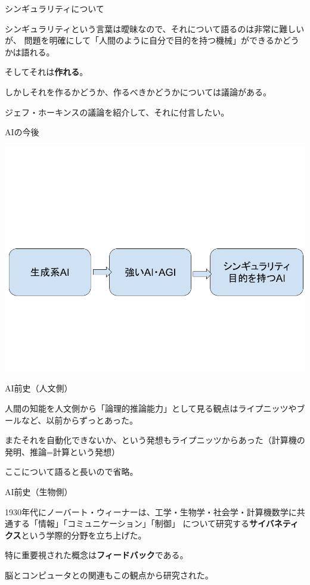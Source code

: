 \documentclass[12pt, unicode]{beamer}
\begin{document}
\begin{frame}{シンギュラリティについて}

シンギュラリティという言葉は曖昧なので、それについて語るのは非常に難しいが、
問題を明確にして「人間のように自分で目的を持つ機械」ができるかどうかは語れる。

そしてそれは\textbf{作れる}。

しかしそれを作るかどうか、作るべきかどうかについては議論がある。

ジェフ・ホーキンスの議論を紹介して、それに付言したい。

\end{frame}

\begin{frame}{AIの今後}

\centering
\includegraphics[keepaspectratio, scale=0.3]{ai_future.png}

\end{frame}

\begin{frame}{AI前史（人文側）}
 
人間の知能を人文側から「論理的推論能力」として見る観点はライプニッツやブールなど、以前からずっとあった。

またそれを自動化できないか、という発想もライプニッツからあった（計算機の発明、推論=計算という発想）

ここについて語ると長いので省略。

\end{frame}
\begin{frame}{AI前史（生物側）}

1930年代にノーバート・ウィーナーは、工学・生物学・社会学・計算機数学に共通する「情報」「コミュニケーション」「制御」
について研究する\textbf{サイバネティクス}という学際的分野を立ち上げた。

特に重要視された概念は\textbf{フィードバック}である。

脳とコンピュータとの関連もこの観点から研究された。

\end{frame}
\end{document}
